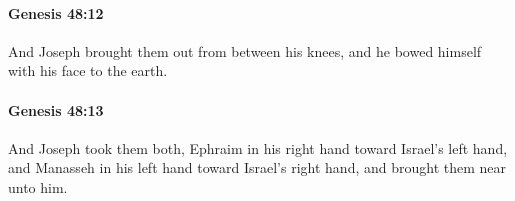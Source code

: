 		\paragraph{Genesis 48:12} %
			\label{GENESIS-48-12}

			And Joseph brought them out from between his knees, and he bowed himself with his face to the earth.


		\paragraph{Genesis 48:13} %
			\label{GENESIS-48-13}

			And Joseph took them both, Ephraim in his right hand toward Israel's left hand, and Manasseh in his left hand toward Israel's right hand, and brought them near unto him.


